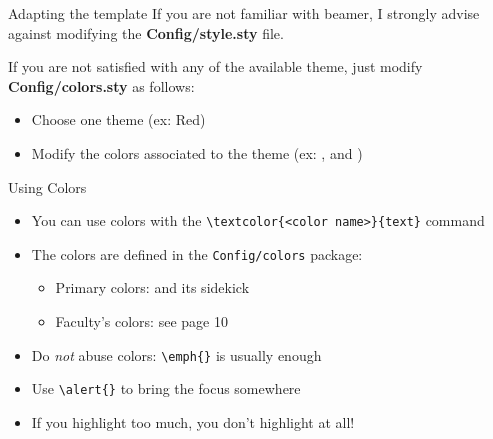 \begin{frame}{Adapting the template}
    If you are not familiar with beamer, I strongly advise against modifying the \textbf{Config/style.sty} file.
    
    \vspace{\baselineskip}
    
    If you are not satisfied with any of the available theme, just modify \textbf{Config/colors.sty} as follows:
    \begin{itemize}
        \item Choose one theme (ex: Red)
        \item Modify the colors associated to the theme (ex: \testcolor{\useMainColor}, \testcolor{\useBlockTitleColor} and \testcolor{\useBlockMainColor})
    \end{itemize}
\end{frame}



\begin{frame}[fragile]{Using Colors}
\begin{itemize}[<alert@2>]
  \item You can use colors with the
        \verb|\textcolor{<color name>}{text}| command
  \item The colors are defined in the \texttt{Config/colors} package:
  \begin{itemize}
  \item Primary colors:  and its sidekick 
  \item Faculty's colors: see page 10
  \end{itemize}
  \item Do \emph{not} abuse colors: \verb|\emph{}| is usually enough
  \item Use \verb|\alert{}| to bring the \alert<3->{focus} somewhere
  \item <3- | alert@3> If you highlight too much, you don't highlight at all!
\end{itemize}
\end{frame}


